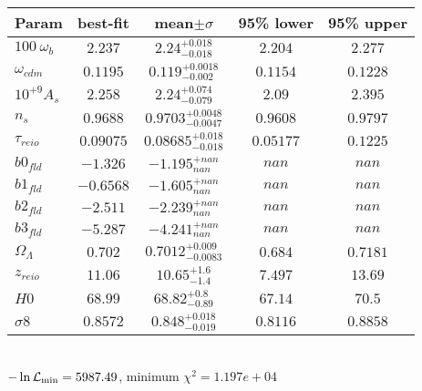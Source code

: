 \begin{tabular}{|l|c|c|c|c|} 
 \hline 
Param & best-fit & mean$\pm\sigma$ & 95\% lower & 95\% upper \\ \hline 
$100~\omega_{b }$ &$2.237$ & $2.24_{-0.018}^{+0.018}$ & $2.204$ & $2.277$ \\ 
$\omega_{cdm }$ &$0.1195$ & $0.119_{-0.002}^{+0.0018}$ & $0.1154$ & $0.1228$ \\ 
$10^{+9}A_{s }$ &$2.258$ & $2.24_{-0.079}^{+0.074}$ & $2.09$ & $2.395$ \\ 
$n_{s }$ &$0.9688$ & $0.9703_{-0.0047}^{+0.0048}$ & $0.9608$ & $0.9797$ \\ 
$\tau_{reio }$ &$0.09075$ & $0.08685_{-0.018}^{+0.018}$ & $0.05177$ & $0.1225$ \\ 
$b0_{fld }$ &$-1.326$ & $-1.195_{nan}^{+nan}$ & $nan$ & $nan$ \\ 
$b1_{fld }$ &$-0.6568$ & $-1.605_{nan}^{+nan}$ & $nan$ & $nan$ \\ 
$b2_{fld }$ &$-2.511$ & $-2.239_{nan}^{+nan}$ & $nan$ & $nan$ \\ 
$b3_{fld }$ &$-5.287$ & $-4.241_{nan}^{+nan}$ & $nan$ & $nan$ \\ 
$\Omega_{\Lambda }$ &$0.702$ & $0.7012_{-0.0083}^{+0.009}$ & $0.684$ & $0.7181$ \\ 
$z_{reio }$ &$11.06$ & $10.65_{-1.4}^{+1.6}$ & $7.497$ & $13.69$ \\ 
$H0$ &$68.99$ & $68.82_{-0.89}^{+0.8}$ & $67.14$ & $70.5$ \\ 
$\sigma8$ &$0.8572$ & $0.848_{-0.019}^{+0.018}$ & $0.8116$ & $0.8858$ \\ 
\hline 
 \end{tabular} \\ 
$-\ln{\cal L}_\mathrm{min} =5987.49$, minimum $\chi^2=1.197e+04$ \\ 
